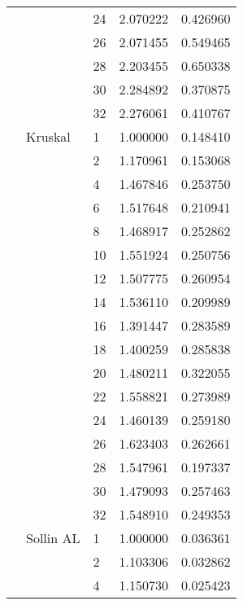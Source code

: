\begin{tabular}{lllrr}
                      &            & 24 &  2.070222 &  0.426960 \\
                      &            & 26 &  2.071455 &  0.549465 \\
                      &            & 28 &  2.203455 &  0.650338 \\
                      &            & 30 &  2.284892 &  0.370875 \\
                      &            & 32 &  2.276061 &  0.410767 \\
                      & Kruskal & 1  &  1.000000 &  0.148410 \\
                      &            & 2  &  1.170961 &  0.153068 \\
                      &            & 4  &  1.467846 &  0.253750 \\
                      &            & 6  &  1.517648 &  0.210941 \\
                      &            & 8  &  1.468917 &  0.252862 \\
                      &            & 10 &  1.551924 &  0.250756 \\
                      &            & 12 &  1.507775 &  0.260954 \\
                      &            & 14 &  1.536110 &  0.209989 \\
                      &            & 16 &  1.391447 &  0.283589 \\
                      &            & 18 &  1.400259 &  0.285838 \\
                      &            & 20 &  1.480211 &  0.322055 \\
                      &            & 22 &  1.558821 &  0.273989 \\
                      &            & 24 &  1.460139 &  0.259180 \\
                      &            & 26 &  1.623403 &  0.262661 \\
                      &            & 28 &  1.547961 &  0.197337 \\
                      &            & 30 &  1.479093 &  0.257463 \\
                      &            & 32 &  1.548910 &  0.249353 \\
                      & Sollin AL & 1  &  1.000000 &  0.036361 \\
                      &            & 2  &  1.103306 &  0.032862 \\
                      &            & 4  &  1.150730 &  0.025423 \\

\end{tabular}
